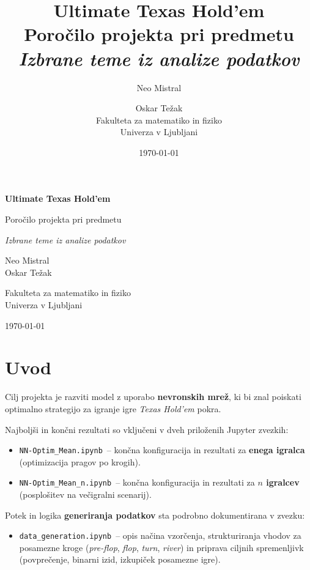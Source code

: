 \documentclass[a4paper,12pt]{article}
\title{\Huge \textbf{Ultimate Texas Hold'em} \\[0.5em]
\Large Poročilo projekta pri predmetu \\[0.2em]
\textit{Izbrane teme iz analize podatkov}}
\author{\Large Neo Mistral \and Oskar Težak \\[1em]
Fakulteta za matematiko in fiziko \\ Univerza v Ljubljani}
\date{\today}
\begin{document}
\begin{titlepage}
    \centering
    \vspace*{3cm}
    
    {\Huge \bfseries Ultimate Texas Hold'em \par}
    \vspace{0.7cm}
    {\Large Poročilo projekta pri predmetu \par}
    \vspace{0.3cm}
    {\LARGE \textit{Izbrane teme iz analize podatkov} \par}
    
    \vfill
    
    {\Large Neo Mistral \\ Oskar Težak \par}
    \vspace{0.5cm}
    {\large Fakulteta za matematiko in fiziko \\ Univerza v Ljubljani \par}
    
    \vfill
    
    {\large \today \par}
\end{titlepage}

\section{Uvod}

Cilj projekta je razviti model z uporabo \textbf{nevronskih mrež}, 
ki bi znal poiskati optimalno strategijo za igranje igre \textit{Texas Hold'em} pokra.

Najboljši in končni rezultati so vključeni v dveh priloženih Jupyter zvezkih:
\begin{itemize}
    \item \texttt{NN-Optim\_Mean.ipynb} \,– končna konfiguracija in rezultati za \textbf{enega igralca} (optimizacija pragov po krogih).
    \item \texttt{NN-Optim\_Mean\_n.ipynb} \,– končna konfiguracija in rezultati za \textbf{$n$ igralcev} (posplošitev na večigralni scenarij).
\end{itemize}

Potek in logika \textbf{generiranja podatkov} sta podrobno dokumentirana v zvezku:
\begin{itemize}
    \item \texttt{data\_generation.ipynb} \,– opis načina vzorčenja, strukturiranja vhodov za posamezne kroge (\emph{pre-flop}, \emph{flop}, \emph{turn}, \emph{river}) in priprava ciljnih spremenljivk (povprečenje, binarni izid, izkupiček posamezne igre).
\end{itemize}
\end{document}
